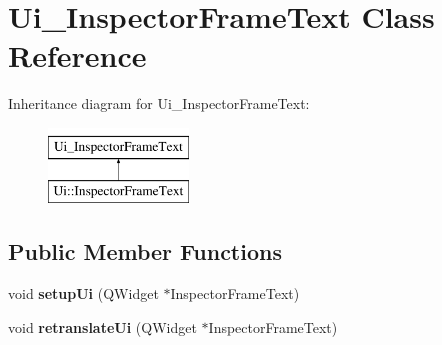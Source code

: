 \hypertarget{class_ui___inspector_frame_text}{}\section{Ui\+\_\+\+Inspector\+Frame\+Text Class Reference}
\label{class_ui___inspector_frame_text}
Inheritance diagram for Ui\+\_\+\+Inspector\+Frame\+Text\+:\begin{figure}[H]
\begin{center}
\leavevmode
\includegraphics[height=2.000000cm]{class_ui___inspector_frame_text}
\end{center}
\end{figure}
\subsection*{Public Member Functions}
\begin{DoxyCompactItemize}
\item 
\mbox{\label{class_ui___inspector_frame_text_a44374ed18efadc4c52f5df091f03f67a}} 
void {\bfseries setup\+Ui} (Q\+Widget $\ast$Inspector\+Frame\+Text)
\item 
\mbox{\label{class_ui___inspector_frame_text_ad68d32d0f03bf5b7c470440812167c4c}} 
void {\bfseries retranslate\+Ui} (Q\+Widget $\ast$Inspector\+Frame\+Text)
\end{DoxyCompactItemize}
